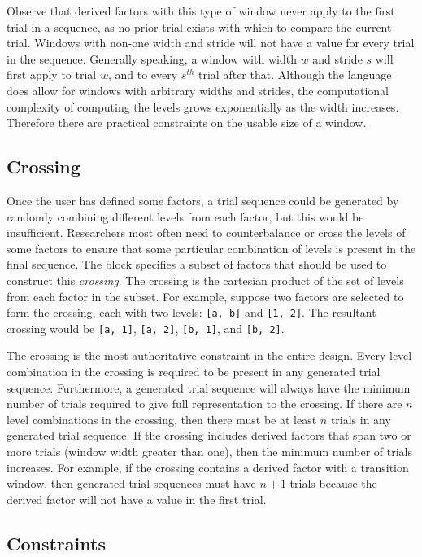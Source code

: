 Observe that derived factors with this type of window never apply to the first trial in a sequence, as no prior trial exists with which to compare the current trial. Windows with non-one width and stride will not have a value for every trial in the sequence. Generally speaking, a window with width $w$ and stride $s$ will first apply to trial $w$, and to every $s^{th}$ trial after that. Although the language does allow for windows with arbitrary widths and strides, the computational complexity of computing the levels grows exponentially as the width increases. Therefore there are practical constraints on the usable size of a window.

\subsection{Crossing}

Once the user has defined some factors, a trial sequence could be generated by randomly combining different levels from each factor, but this would be insufficient. Researchers most often need to counterbalance or cross the levels of some factors to ensure that some particular combination of levels is present in the final sequence. The block specifies a subset of factors that should be used to construct this \textit{crossing}. The crossing is the cartesian product of the set of levels from each factor in the subset. For example, suppose two factors are selected to form the crossing, each with two levels: \texttt{[a, b]} and \texttt{[1, 2]}. The resultant crossing would be \texttt{[a, 1]}, \texttt{[a, 2]}, \texttt{[b, 1]}, and \texttt{[b, 2]}.

The crossing is the most authoritative constraint in the entire design. Every level combination in the crossing is required to be present in any generated trial sequence. Furthermore, a generated trial sequence will always have the minimum number of trials required to give full representation to the crossing. If there are $n$ level combinations in the crossing, then there must be at least $n$ trials in any generated trial sequence. If the crossing includes derived factors that span two or more trials (window width greater than one), then the minimum number of trials increases. For example, if the crossing contains a derived factor with a transition window, then generated trial sequences must have $n+1$ trials because the derived factor will not have a value in the first trial.

\subsection{Constraints}

